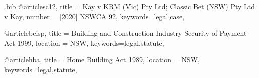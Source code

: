

\begin{filecontents*}{\jobname.bib}
@article{sc12,
title = {Kay v KRM (Vic) Pty Ltd; Classic Bet (NSW) Pty Ltd v Kay},
number = {[2020] NSWCA 92},
keywords={legal,case},
}

@article{bcisp,
title = {Building and Construction Industry Security of Payment Act 1999},
location = {NSW},
keywords={legal,statute},
}

@article{hba,
title = {Home Building Act 1989},
location = {NSW},
keywords={legal,statute},
}

\end{filecontents*}



\documentclass[12pt,varwidth,border=6pt]{standalone}
\newcommand\rulesep{\rule{0.4\textwidth}{.4pt}}
\usepackage[table]{xcolor}
\pagecolor{blue!3}
\usepackage{fontspec}
\setmainfont{Noto Serif}




\newcommand\abibname{ext-authortitle-ibid}
\newcommand\abibstyle{style=\abibname}
\usepackage[
	\abibstyle , 
	indexing=cite,
	citetracker=true,
	ibidtracker=true,
	pagetracker=true,
	idemtracker=true,
	opcittracker=true,
	loccittracker=true,
	autocite=footnote,
		]{biblatex}




				
%
{%
\usebibmacro{prenote}%
}%
{%
\mkbibemph{\thefield{title}}%
\iffieldundef{number}{}{\addspace\thefield{number}}%
\iflistundef{location}{}{\addspace\mkbibparens{\printlist{location}}}%
}%
{%
\multicitedelim%
}%
{%
\usebibmacro{postnote}%
}





\usepackage[
				bookmarks,
            colorlinks=true,        
            allcolors = black,  
            citecolor=blue, 
            hyperindex=false,       
]{hyperref}







Custom citation command + @article bibentry type:

 and  and .

x \parencite{reese,kullback:related,aristotle:anima}.

\printbibliography%
 
